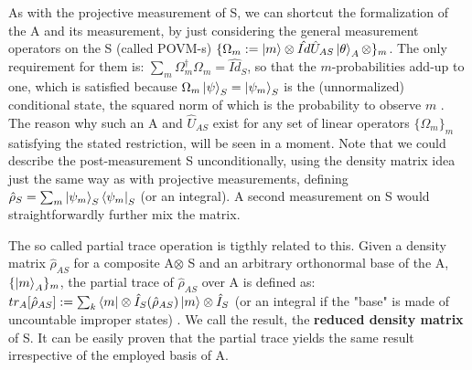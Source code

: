 \documentclass[11pt, a4paper]{article} %
\begin{document}
As with the projective measurement of S, we can shortcut the formalization of the A and its measurement, by just considering the general measurement operators on the S (called POVM-s) $\{\Omega_m:=\ket{m}\otimes\hat{Id}\hat{U}_{AS}\ket{\theta}_A\otimes\}_m$. The only requirement for them is: $\sum_m \Omega_m^\dagger\Omega_m=\hat{Id}_S$, so that the $m$-probabilities add-up to one, which is satisfied because $\Omega_m\ket{\psi}_S=\ket{\psi_m}_S$ is the (unnormalized) conditional state, the squared norm of which is the probability to observe $m$ \cite{Generalized, Durr}. The reason why such an A and $\hat{U}_{AS}$  exist for any set of linear operators $\{\Omega_m\}_m$ satisfying the stated restriction, will be seen in a moment. Note that we could describe the post-measurement S unconditionally, using the density matrix idea just the same way as with projective measurements, defining $\hat{\rho}_S=\sum_m \ket{\psi_m}_S\bra{\psi_m}_S$ (or an integral). A second measurement on S would straightforwardly further mix the matrix.

The so called partial trace operation is tigthly related to this. Given a density matrix $\hat{\rho}_{AS}$ for a composite A$\otimes$ S and an arbitrary orthonormal base of the A, $\{\ket{m}_A\}_m$, the partial trace of $\hat{\rho}_{AS}$ over A is defined as: $tr_{A}[\hat{\rho}_{AS}] := \sum_k \bra{m}\otimes \hat{I}_S(\hat{\rho}_{AS})\ket{m}\otimes \hat{I}_S$ (or an integral if the "base" is made of uncountable improper states) \cite{Generalized, Durr}. We call the result, the {\bf reduced density matrix} of S. It can be easily proven that the partial trace yields the same result irrespective of the employed basis of A.
\end{document}
